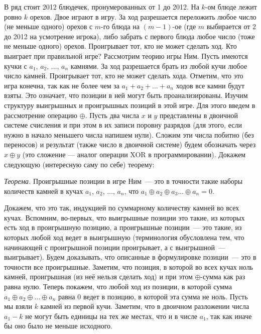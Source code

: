 \problem{}
В ряд стоит 2012 блюдечек, пронумерованных от 1 до 2012.
На $k$-ом блюде лежит ровно $k$ орехов.
Двое играют в игру.
За ход разрешается переложить любое число (не меньше одного) орехов с $m$-го
блюда на $(m - 1)$-ое (где $m$ выбирается от 2 до 2012 на усмотрение игрока),
либо забрать с первого блюда любое число (тоже не меньше одного) орехов.
Проигрывает тот, кто не может сделать ход.
Кто выиграет при правильной игре?
\solution
Рассмотрим теорию игры Ним.
Пусть имеются кучки с $a_1$, $a_2$, $\ldots$, $a_n$ камнями.
За ход разрешается брать из любой кучи любое число камней.
Проигрывает тот, кто не может сделать хода.
Отметим, что это игра конечна, так как не более чем за
$a_1 + a_2 + \ldots + a_n$ ходов все камни будут взяты.
Это означает, что позиции в ней могут быть проанализированы.
Изучим структуру выигрышных и проигрышных позиций в этой игре.
Для этого введем в рассмотрение операцию $\oplus$.
Пусть два числа $x$ и $y$ представлены в двоичной системе счисления и при этом
в их записи поровну разрядов
(для этого, если нужно в начало меньшего числа напишем нули).
Сложим эти числа побитно (без переносов) и результат
(также число в двоичной системе) будем обозначать через $x \oplus y$
(это сложение --- аналог операции XOR в программировании).
Докажем следующую (интересную саму по себе) теорему:
\par
\emph{Теорема.}
Проигрышные позиции в игре Ним~--- это в точности такие наборы количеств
камней в кучах $a_1$, $a_2$, $\ldots$, $a_n$, что
$a_1 \oplus a_2 \oplus a_3 \ldots \oplus a_n = 0$.
\par
Докажем, что это так, индукцией по суммарному количеству камней во всех кучах.
Вспомним, во-первых, что выигрышные позиции это такие, из которых есть ход
в проигрышную позицию, а проигрышные позиции~--- это такие, из которых любой
ход ведет в выигрышную
(терминология обусловлена тем, что начинающей с проигрышной позиции
проигрывает, а с выигрышной~--- выигрывает).
Будем доказывать, что описанные в формулировке позиции~--- это в точности все
проигрышные.
Заметим, что позиция, в которой во всех кучах ноль камней, проигрышная
(из неё нельзя сделать ход) и при этом $\oplus$-сумма как раз равна нулю.
Теперь покажем, что любой ход из позиции, в которой сумма
$a_1 \oplus a_2 \oplus \ldots \oplus a_n$ равна 0 ведет в позицию, в которой
эта сумма не ноль.
Пусть мы взяли $k$ камней из первой кучи.
Заметим, что в двоичном разложении числа $a_1 - k$ не могут быть единицы на тех
же местах, что и в числе $a_1$, так как иначе бы оно было не меньше исходного.
